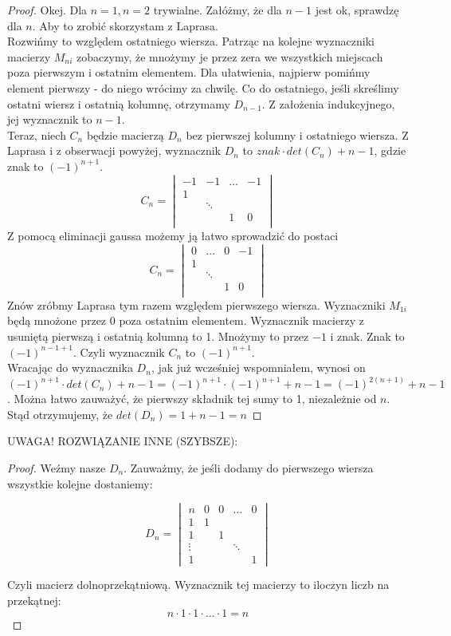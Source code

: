 \documentclass[a4paper]{article}
\begin{document}
\begin{proof}
Okej. Dla $n=1, n=2$ trywialne. Załóżmy, że dla $n-1$ jest ok, sprawdzę dla $n$. Aby to zrobić skorzystam z Laprasa.\\
Rozwińmy to względem ostatniego wiersza. Patrząc na kolejne wyznaczniki macierzy $M_{ni}$ zobaczymy, że mnożymy je przez zera we wszystkich miejscach poza pierwszym i ostatnim elementem. Dla ułatwienia, najpierw pomińmy element pierwszy - do niego wrócimy za chwilę. Co do ostatniego, jeśli skreślimy ostatni wiersz i ostatnią kolumnę, otrzymamy $D_{n-1}$. Z założenia indukcyjnego, jej wyznacznik to $n-1$.\\
Teraz, niech $C_n$ będzie macierzą $D_n$ bez pierwszej kolumny i ostatniego wiersza. Z Laprasa i z obserwacji powyżej, wyznacznik $D_n$ to $znak \cdot det(C_n) + n-1$, gdzie znak to $(-1)^{n+1}$.
$$C_n = \begin{vmatrix}
-1 & -1 & \dots & -1\\
1\\
& \ddots\\
& & 1 & 0\\
\end{vmatrix} $$
Z pomocą eliminacji gaussa możemy ją łatwo sprowadzić do postaci
$$C_n = \begin{vmatrix}
0 & \dots & 0 & -1\\
1\\
& \ddots\\
& & 1 & 0\\
\end{vmatrix} $$
Znów zróbmy Laprasa tym razem względem pierwszego wiersza. Wyznaczniki $M_{1i}$ będą mnożone przez 0 poza ostatnim elementem. Wyznacznik macierzy z usuniętą pierwszą i ostatnią kolumną to 1. Mnożymy to przez $-1$ i znak. Znak to $(-1)^{n-1+1}$. Czyli wyznacznik $C_n$ to $(-1)^{n+1}$.\\
Wracając do wyznacznika $D_n$, jak już wcześniej wspomniałem, wynosi on $(-1)^{n+1} \cdot det(C_n) + n-1 = (-1)^{n+1} \cdot (-1)^{n+1} + n-1 = (-1)^{2(n+1)} +n-1$. Można łatwo zauważyć, że pierwszy składnik tej sumy to 1, niezależnie od $n$. Stąd otrzymujemy, że $det(D_n)=1+n-1=n$
\end{proof}

\clearpage
UWAGA! ROZWIĄZANIE INNE (SZYBSZE):
\begin{proof}
Weźmy nasze $D_n$. Zauważmy, że jeśli dodamy do pierwszego wiersza wszystkie kolejne dostaniemy:

$$D_n = \begin{vmatrix}
n & 0 & 0 & \dots & 0\\
1 & 1\\
1 & & 1\\
\vdots & & & \ddots\\
1 & & & & 1 
\end{vmatrix} $$

Czyli macierz dolnoprzekątniową. Wyznacznik tej macierzy to iloczyn liczb na przekątnej: $$n\cdot 1\cdot 1\cdot \dots \cdot 1 = n$$


\end{proof}
\end{document}
